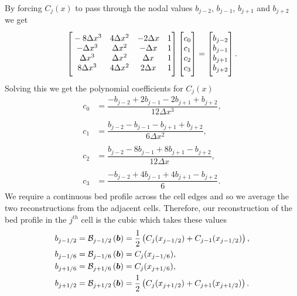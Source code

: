 By forcing $C_j(x)$ to pass through the nodal values $b_{j-2}$, $b_{j-1}$, $b_{j+1}$ and $b_{j+2}$ we get
\begin{equation*}
\begin{bmatrix}
\TM -8\Delta x^3 & 4\Delta x^2  & -2\Delta x & 1\\
-\Delta x^3 & \Delta x^2  &-\Delta x & 1\\
\Delta x^3 & \Delta x^2  & \Delta x & 1\\
8\Delta x^3 & 4\Delta x^2  & 2\Delta x & 1 \BM 
\end{bmatrix}
\begin{bmatrix}
 \TM c_0 \\ c_1 \\ c_2 \\ c_3  \BM\end{bmatrix} =  \begin{bmatrix}
 \TM b_{j-2} \\ b_{j-1}\\ b_{j+1} \\ b_{j+2} \BM
\end{bmatrix}.
\end{equation*}
Solving this we get the polynomial coefficients for $C_j(x)$
\begin{align*}
c_0 &=  \dfrac{-b_{j-2} + 2b_{j-1} - 2 b_{j+1} + b_{j+2}}{12 \Delta x^3},\\ \\
c_1 &=  \dfrac{b_{j-2} - b_{j-1} - b_{j+1} + b_{j+2}}{6 \Delta x^2},\\ \\
c_2 &=  \dfrac{b_{j-2} - 8b_{j-1} + 8 b_{j+1} - b_{j+2}}{12 \Delta x},\\ \\
c_3 &=  \dfrac{-b_{j-2}  + 4b_{j-1} + 4 b_{j+1} - b_{j+2}}{6}.
\end{align*}
We require a continuous bed profile across the cell edges and so we average the two reconstructions from the adjacent cells. Therefore, our reconstruction of the bed profile in the $j^{th}$ cell is the cubic which takes these values
\begin{subequations}
\begin{align}
b_{j-1/2} &=  \mathcal{B}_{j-1/2}\left(\boldsymbol{b}\right) =  \frac{1}{2}\left( C_j(x_{j-1/2}) + C_{j-1}(x_{j-1/2})\right),\\
b_{j-1/6} &=  \mathcal{B}_{j-1/6}\left(\boldsymbol{b}\right) =  C_j(x_{j-1/6}),\\
b_{j+1/6} &=  \mathcal{B}_{j+1/6}\left(\boldsymbol{b}\right) =  C_j(x_{j+1/6}),\\
b_{j+1/2} &=  \mathcal{B}_{j+1/2}\left(\boldsymbol{b}\right) =  \frac{1}{2}\left( C_j(x_{j+1/2}) + C_{j+1}(x_{j+1/2})\right).
\end{align}
\label{eqn:FEVMbedrecon}
\end{subequations}


